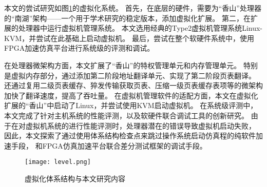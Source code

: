 本文的尝试研究如图\ref{fig:level}的虚拟化系统。
首先，在底层的硬件，需要为“香山”处理器的“南湖”架构——一个用于学术研究的稳定版本，添加虚拟化扩展。
第二，在扩展的处理器中运行虚拟机管理系统。
本文选用经典的Type2虚拟机管理系统Linux-KVM\cite{kvm:H-ext}，并尝试在此基础上启动虚拟机。
最后，尝试在整个软硬件系统中，使用FPGA加速仿真平台进行系统级的评测和调试。

在处理器微架构方面，本文扩展了“香山”的特权管理单元和内存管理单元。
特别是虚拟内存部分，通过添加第二阶段地址翻译单元、实现了第二阶段页表翻译。
还通过复用二级页表缓存、猝发传输获取页表、压缩一级页表缓存表项等的微架构加快了翻译速度，提高了吞吐量。
在虚拟机管理软件的适配方面，本文在虚拟化扩展的“香山”中启动了Linux，并尝试使用KVM启动虚拟机。
在系统级评测中，本文完成了针对主机系统的性能评测，以及软硬件联合调试工具的创新研究。
由于在对虚拟机系统的进行性能评测时，处理器潜在的错误导致虚拟机启动失败，
因此，本文探索了通过使用体系结构检查点来跳过操作系统启动仿真程的纯软件加速手段，
和FPGA仿真加速平台联合差分测试框架的调试手段。

\begin{figure}[htbp]
    \centering
    \texttt{[image: level.png]}
\caption{虚拟化体系结构与本文研究内容}
    \label{fig:level}
\end{figure}
